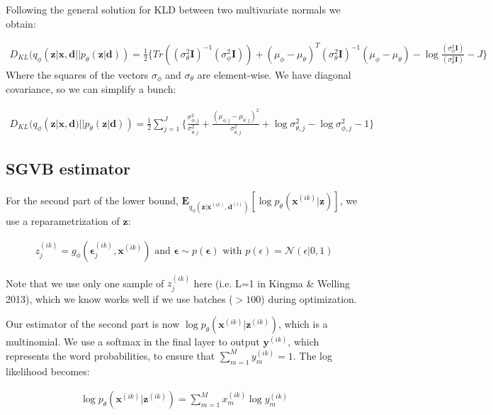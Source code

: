 \documentclass{article}
\begin{document}
Following the general solution for KLD between two multivariate normals we obtain:

\begin{align}
D_{KL}(q_\phi (\mathbf{z}| \mathbf{x}, \mathbf{d}||p_\theta (\mathbf{z}| \mathbf{d})) = \frac{1}{2}\{Tr((\sigma_\theta^2\mathbf{I})^{-1}(\sigma_\phi^2\mathbf{I})) + (\mu_\phi - \mu_\theta)^T(\sigma_\theta^2\mathbf{I})^{-1}(\mu_\phi - \mu_\theta) - \log\frac{(\sigma_\phi^2\mathbf{I})}{(\sigma_\theta^2\mathbf{I})} - J\}
\end{align}
Where the squares of the vectors $\sigma_\phi$ and $\sigma_\theta$ are element-wise. We have diagonal covariance, so we can simplify a bunch:

\begin{align}
D_{KL}(q_\phi (\mathbf{z}| \mathbf{x}, \mathbf{d})||p_\theta (\mathbf{z}| \mathbf{d})) = \frac{1}{2}\sum\limits_{j=1}^{J}\{\frac{\sigma_{\phi,j}^2}{\sigma_{\theta,j}^2} + \frac{(\mu_{\phi,j} - \mu_{\theta,j})^2}{\sigma_{\theta,j}^2} + \log \sigma_{\theta,j}^2 - \log \sigma_{\phi,j}^2 - 1\}
\end{align}

\subsection{SGVB estimator}

For the second part of the lower bound, $\mathbf{E}_{q_\phi(\mathbf{z}|\mathbf{x}^{(ik)},\mathbf{d}^{(i)})}[\log p_\theta (\mathbf{x}^{(ik)}|\mathbf{z})]$, we use a reparametrization of $\mathbf{z}$:

\begin{align} z_j^{(ik)} = g_\phi(\mathbf{\epsilon}_j^{(ik)}, \mathbf{x}^{(ik)}) \text{    and    } \mathbf{\epsilon} 
 \sim p(\mathbf{\epsilon}) \text{   with  } p(\epsilon) = \mathcal{N}(\epsilon|0,1)
\end{align}

Note that we use only one sample of $z_j^{(ik)}$ here (i.e. L=1 in Kingma \& Welling 2013), which we know works well if we use batches ($>100$) during optimization.

Our estimator of the second part is now $\log p_\theta (\mathbf{x}^{(ik)}|\mathbf{z}^{(ik)})$, which is a multinomial. We use a softmax in the final layer to output $\mathbf{y}^{(ik)}$, which represents the word probabilities, to ensure that $\sum\limits_{m=1}^M y_m^{(ik)} = 1$. The log likelihood becomes: 

\begin{align}
\log p_\theta (\mathbf{x}^{(ik)}|\mathbf{z}^{(ik)}) = \sum\limits_{m=1}^{M}x_m^{(ik)}\log y_m^{(ik)}
\end{align}
\end{document}
